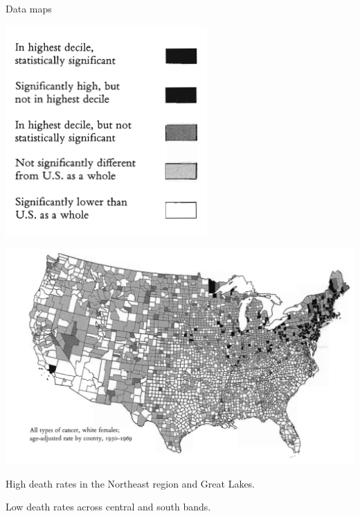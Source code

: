 \documentclass[
  ignorenonframetext,
]{beamer}
\begin{document}
\begin{frame}{Data maps}
\label{data-maps-1}
\begin{minipage}{0.3\textwidth}
\centering
\includegraphics[width=\textwidth]{excellence_figs/fig_7.png}
\end{minipage}
\hfill
\begin{minipage}{0.6\textwidth}
\centering
\includegraphics[width=\textwidth]{excellence_figs/fig_6.png}
\end{minipage}

High death rates in the Northeast region and Great Lakes.

Low death rates across central and south bands.
\end{frame}
\end{document}
